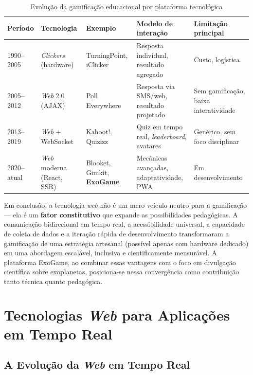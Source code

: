 \documentclass[
	12pt,
	openany,
	oneside,
	a4paper,
	english,
	brazil
]{abntex2}
\begin{document}
\begin{table}[htb]
\caption{\label{tab:evolucao_gamificacao_web}Evolução da gamificação educacional por plataforma tecnológica}
\begin{tabular}{p{2cm}|p{2.5cm}|p{2.5cm}|p{2.8cm}|p{3cm}}
  \toprule
  \textbf{Período} & \textbf{Tecnologia} & \textbf{Exemplo} & \textbf{Modelo de interação} & \textbf{Limitação principal} \\
  \midrule
  1990--2005 & \textit{Clickers} (hardware) & TurningPoint, iClicker & Resposta individual, resultado agregado & Custo, logística \\
  \midrule
  2005--2012 & \textit{Web} 2.0 (AJAX) & Poll Everywhere & Resposta via SMS/web, resultado projetado & Sem gamificação, baixa interatividade \\
  \midrule
  2013--2019 & \textit{Web} + WebSocket & Kahoot!, Quizizz & Quiz em tempo real, \textit{leaderboard}, avatares & Genérico, sem foco disciplinar \\
  \midrule
  2020--atual & \textit{Web} moderna (React, SSR) & Blooket, Gimkit, \textbf{ExoGame} & Mecânicas avançadas, adaptatividade, PWA & Em desenvolvimento \\
  \bottomrule
\end{tabular}
\end{table}

Em conclusão, a tecnologia \textit{web} não é um mero veículo neutro para a gamificação --- ela é um \textbf{fator constitutivo} que expande as possibilidades pedagógicas. A comunicação bidirecional em tempo real, a acessibilidade universal, a capacidade de coleta de dados e a iteração rápida de desenvolvimento transformaram a gamificação de uma estratégia artesanal (possível apenas com hardware dedicado) em uma abordagem escalável, inclusiva e cientificamente mensurável. A plataforma ExoGame, ao combinar essas vantagens com o foco em divulgação científica sobre exoplanetas, posiciona-se nessa convergência como contribuição tanto técnica quanto pedagógica.

\section{Tecnologias \textit{Web} para Aplicações em Tempo Real}\label{sec:tecnologias}

\subsection{A Evolução da \textit{Web} em Tempo Real}
\end{document}
